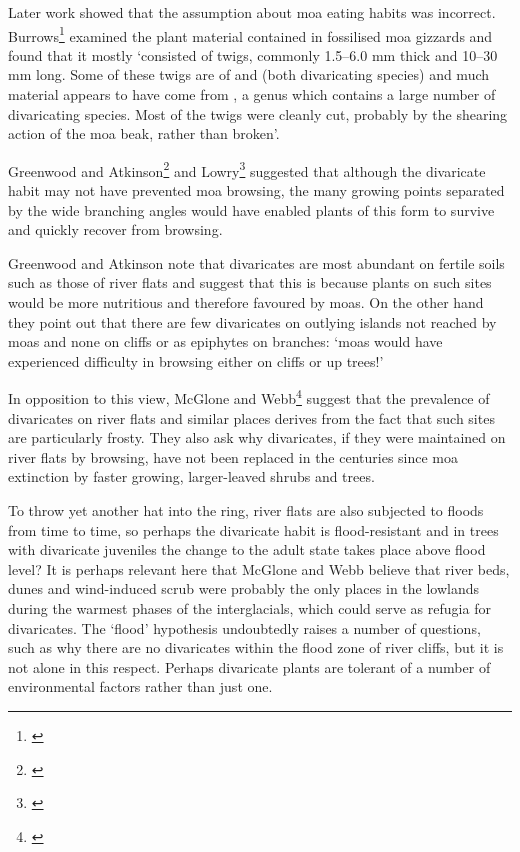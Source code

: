 Later work showed that the assumption about moa eating habits was incorrect.
Burrows\footnote{\cite{burrows1980moas}} examined the plant material contained in fossilised moa gizzards and found that it mostly `consisted of twigs, commonly 1.5–6.0 mm thick and 10–30 mm long.
Some of these twigs are of  and  (both divaricating species) and much material appears to have come from , a genus which contains a large number of divaricating species.
Most of the twigs were cleanly cut, probably by the shearing action of the moa beak, rather than broken'.

Greenwood and Atkinson\footnote{\cite{atkinson1980divaricating}} and Lowry\footnote{\cite{lowry1980evolution}} suggested that although the divaricate habit may not have prevented moa browsing, the many growing points separated by the wide branching angles would have enabled plants of this form to survive and quickly recover from browsing.

Greenwood and Atkinson note that divaricates are most abundant on fertile soils such as those of river flats and suggest that this is because plants on such sites would be more nutritious and therefore favoured by moas.
On the other hand they point out that there are few divaricates on outlying islands not reached by moas and none on cliffs or as epiphytes on branches: `moas would have experienced difficulty in browsing either on cliffs or up trees!'

In opposition to this view, McGlone and Webb\footnote{\cite{mcglone1981selective}} suggest that the prevalence of divaricates on river flats and similar places derives from the fact that such sites are particularly frosty.
They also ask why divaricates, if they were maintained on river flats by browsing, have not been replaced in the centuries since moa extinction by faster growing, larger-leaved shrubs and trees.

To throw yet another hat into the ring, river flats are also subjected to floods from time to time, so perhaps the divaricate habit is flood-resistant and in trees with divaricate juveniles the change to the adult state takes place above flood level? It is perhaps relevant here that McGlone and Webb believe that river beds, dunes and wind-induced scrub were probably the only places in the lowlands during the warmest phases of the interglacials, which could serve as refugia for divaricates.
The `flood' hypothesis undoubtedly raises a number of questions, such as why there are no divaricates within the flood zone of river cliffs, but it is not alone in this respect.
Perhaps divaricate plants are tolerant of a number of environmental factors rather than just one.

